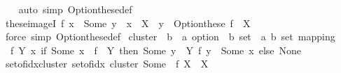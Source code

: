 \begin{isabellebody}
%
\isadelimproof
\ \ %
\endisadelimproof
%
\isatagproof
{}\isamarkupfalse%
\ {\isacharparenleft}{\kern0pt}auto\ simp{\isacharcolon}{\kern0pt}\ Option{\isachardot}{\kern0pt}these{\isacharunderscore}{\kern0pt}def{\isacharparenright}{\kern0pt}%
\endisatagproof
{\isafoldproof}%
%
\isadelimproof
\isanewline
%
\endisadelimproof
\isanewline
{}\isamarkupfalse%
\ these{\isacharunderscore}{\kern0pt}imageI{\isacharcolon}{\kern0pt}\ {\isachardoublequoteopen}f\ x\ {\isacharequal}{\kern0pt}\ Some\ y\ {\isasymLongrightarrow}\ x\ {\isasymin}\ X\ {\isasymLongrightarrow}\ y\ {\isasymin}\ Option{\isachardot}{\kern0pt}these\ {\isacharparenleft}{\kern0pt}f\ {\isacharbackquote}{\kern0pt}\ X{\isacharparenright}{\kern0pt}{\isachardoublequoteclose}\isanewline
%
\isadelimproof
\ \ %
\endisadelimproof
%
\isatagproof
{}\isamarkupfalse%
\ {\isacharparenleft}{\kern0pt}force\ simp{\isacharcolon}{\kern0pt}\ Option{\isachardot}{\kern0pt}these{\isacharunderscore}{\kern0pt}def{\isacharparenright}{\kern0pt}%
\endisatagproof
{\isafoldproof}%
%
\isadelimproof
\isanewline
%
\endisadelimproof
\isanewline
{}\isamarkupfalse%
\ cluster\ {\isacharcolon}{\kern0pt}{\isacharcolon}{\kern0pt}\ {\isachardoublequoteopen}{\isacharparenleft}{\kern0pt}{\isacharprime}{\kern0pt}b\ {\isasymRightarrow}\ {\isacharprime}{\kern0pt}a\ option{\isacharparenright}{\kern0pt}\ {\isasymRightarrow}\ {\isacharprime}{\kern0pt}b\ set\ {\isasymRightarrow}\ {\isacharparenleft}{\kern0pt}{\isacharprime}{\kern0pt}a{\isacharcomma}{\kern0pt}\ {\isacharprime}{\kern0pt}b\ set{\isacharparenright}{\kern0pt}\ mapping{\isachardoublequoteclose}\ \isanewline
\ \ {\isachardoublequoteopen}{\isasymlambda}f\ Y\ x{\isachardot}{\kern0pt}\ if\ Some\ x\ {\isasymin}\ f\ {\isacharbackquote}{\kern0pt}\ Y\ then\ Some\ {\isacharbraceleft}{\kern0pt}y\ {\isasymin}\ Y{\isachardot}{\kern0pt}\ f\ y\ {\isacharequal}{\kern0pt}\ Some\ x{\isacharbraceright}{\kern0pt}\ else\ None{\isachardoublequoteclose}%
\isadelimproof
\ %
\endisadelimproof
%
\isatagproof
\isacommand{{\isachardot}{\kern0pt}}\isamarkupfalse%
%
\endisatagproof
{\isafoldproof}%
%
\isadelimproof
%
\endisadelimproof
\isanewline
\isanewline
{}\isamarkupfalse%
\ set{\isacharunderscore}{\kern0pt}of{\isacharunderscore}{\kern0pt}idx{\isacharunderscore}{\kern0pt}cluster{\isacharcolon}{\kern0pt}\ {\isachardoublequoteopen}set{\isacharunderscore}{\kern0pt}of{\isacharunderscore}{\kern0pt}idx\ {\isacharparenleft}{\kern0pt}cluster\ {\isacharparenleft}{\kern0pt}Some\ {\isasymcirc}\ f{\isacharparenright}{\kern0pt}\ X{\isacharparenright}{\kern0pt}\ {\isacharequal}{\kern0pt}\ X{\isachardoublequoteclose}\isanewline

\end{isabellebody}
